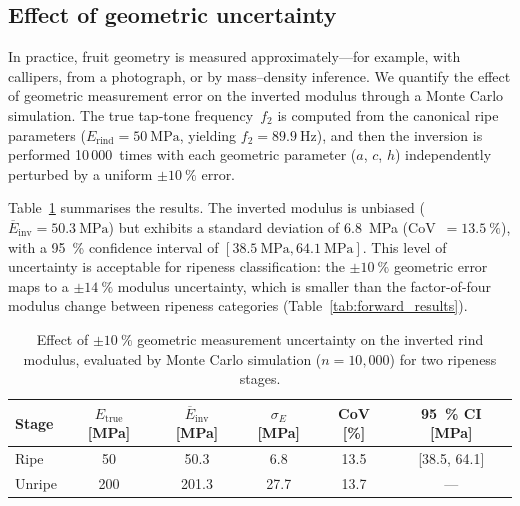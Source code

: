 \subsection{Effect of geometric uncertainty}
\label{sec:geom_uncertainty}

In practice, fruit geometry is measured approximately---for example, with
callipers, from a photograph, or by mass--density inference.  We quantify
the effect of geometric measurement error on the inverted modulus through
a Monte Carlo simulation.  The true tap-tone frequency~$f_2$ is computed
from the canonical ripe parameters
($E_{\mathrm{rind}} = \SI{50}{\mega\pascal}$, yielding
$f_2 = \SI{89.9}{\hertz}$), and then the inversion is performed
10\,000~times with each geometric parameter ($a$, $c$, $h$) independently
perturbed by a uniform $\pm\SI{10}{\percent}$ error.

Table~\ref{tab:geom_uncertainty} summarises the results.  The inverted
modulus is unbiased
($\overline{E}_{\mathrm{inv}} = \SI{50.3}{\mega\pascal}$) but exhibits
a standard deviation of \SI{6.8}{\mega\pascal}
(CoV~$= \SI{13.5}{\percent}$), with a \SI{95}{\percent} confidence
interval of $[\SI{38.5}{\mega\pascal}, \SI{64.1}{\mega\pascal}]$.  This
level of uncertainty is acceptable for ripeness classification: the
$\pm\SI{10}{\percent}$ geometric error maps to a $\pm\SI{14}{\percent}$
modulus uncertainty, which is smaller than the factor-of-four modulus
change between ripeness categories (Table~\ref{tab:forward_results}).

\begin{table}[t]
  \centering
  \caption{Effect of $\pm\SI{10}{\percent}$ geometric measurement
    uncertainty on the inverted rind modulus, evaluated by Monte Carlo
    simulation ($n = 10{,}000$) for two ripeness stages.}
  \label{tab:geom_uncertainty}
  \begin{tabular}{lccccc}
    \toprule
    Stage & $E_{\mathrm{true}}$ [MPa] &
      $\overline{E}_{\mathrm{inv}}$ [MPa] &
      $\sigma_E$ [MPa] & CoV [\%] &
      \SI{95}{\percent} CI [MPa] \\
    \midrule
    Ripe   &  50 &  50.3 &  6.8 & 13.5 & [38.5, 64.1] \\
    Unripe & 200 & 201.3 & 27.7 & 13.7 & --- \\
    \bottomrule
  \end{tabular}
\end{table}

